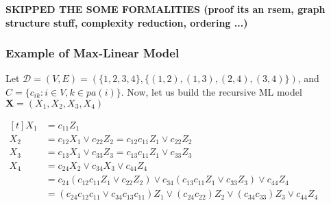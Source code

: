 \documentclass[12pt]{article}
\def\d{\mathcal{D}}
\def\x{\mathbf{X}}
\theoremstyle{definition}
\begin{document}
\textbf{SKIPPED THE SOME FORMALITIES (proof its an rsem, graph structure stuff, complexity reduction, ordering ...) }
\pagebreak

\subsubsection{Example of Max-Linear Model}
Let $\d=(V,E)=(\{1,2,3,4\}, \{(1,2),(1,3), (2,4),(3,4)\})$, and $C=\{c_{ik}: i\in V, k\in pa(i)\}$. Now, let us build the recursive ML model $\x= (X_1,X_2,X_3,X_4)$\\
\begin{minipage}{0.5 \linewidth}
$ 
\begin{aligned}[t] 
X_1&= c_{11}Z_1\\
X_2&= c_{12}X_1\vee c_{22}Z_2 =c_{12}c_{11}Z_1 \vee c_{22}Z_2\\
X_3&= c_{13}X_1\vee c_{33}Z_3 =c_{13}c_{11}Z_1 \vee c_{33}Z_3\\
X_4&= c_{24}X_2\vee c_{34}X_3\vee c_{44}Z_4\\
&=c_{24}(c_{12}c_{11}Z_1 \vee c_{22}Z_2)\vee c_{34}(c_{13}c_{11}Z_1 \vee c_{33}Z_3)\vee c_{44}Z_4\\
&=(c_{24}c_{12}c_{11}\vee c_{34}c_{13}c_{11})Z_1 \vee (c_{24}c_{22})Z_2\vee (c_{34}c_{33})Z_3 \vee c_{44}Z_4\\
\end{aligned}
$
\end{minipage}
\begin{minipage}{0.2 \linewidth}
~
\end{minipage}
\end{document}
